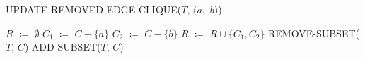 \begin{algorithm}[H]
    \caption{UPDATE-REMOVED-EDGE-CLIQUE($T$, $(a,$ $b)$)}
    \begin{algorithmic}[1]
    	\State $R$ $\coloneqq$ $\emptyset$
		\State $C_1$ $\coloneqq$ $C - \{a\}$
		\State $C_2$ $\coloneqq$ $C - \{b\}$
		\State $R$ $\coloneqq$ $R\cup \{C_1, C_2\}$
		\State REMOVE-SUBSET($T$, $C$)
	\EndFor
			\State ADD-SUBSET($T$, $C$)
		\EndIf
	\EndFor
    \end{algorithmic}
\end{algorithm}
